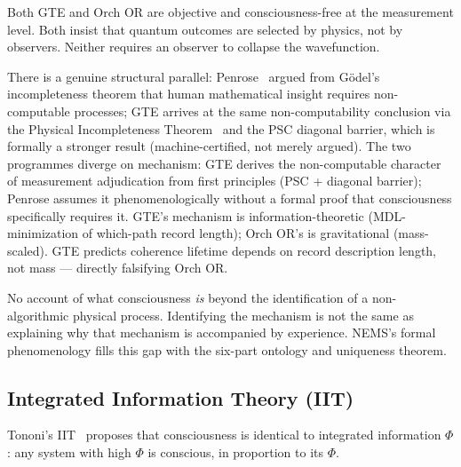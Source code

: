 \documentclass[11pt]{article}
\theoremstyle{remark}
\begin{document}
\medskip
\begin{termlist}
  \item[Genuine overlap]
    Both GTE and Orch OR are objective and consciousness-free at the measurement level.
    Both insist that quantum outcomes are selected by physics, not by observers. Neither
    requires an observer to collapse the wavefunction.

  \item[Key differences]
    There is a genuine structural parallel: Penrose~\cite{Penrose1989} argued
    from Gödel's incompleteness theorem that human mathematical insight requires
    non-computable processes; GTE arrives at the same non-computability conclusion
    via the Physical Incompleteness Theorem~\cite{SpivackNEMS11} and the PSC diagonal
    barrier, which is formally a stronger result (machine-certified, not merely argued).
    The two programmes diverge on mechanism: GTE derives the non-computable character
    of measurement adjudication from first
    principles (PSC + diagonal barrier); Penrose assumes it phenomenologically without
    a formal proof that consciousness specifically requires it.
    GTE's mechanism is information-theoretic (MDL-minimization of which-path record
    length); Orch OR's is gravitational (mass-scaled). GTE predicts coherence
    lifetime depends on record description length, not mass --- directly
    falsifying Orch OR.

  \item[What Orch OR lacks]
    No account of what consciousness \emph{is} beyond the identification of a
    non-algorithmic physical process. Identifying the mechanism is not the same as
    explaining why that mechanism is accompanied by experience. NEMS's formal
    phenomenology fills this gap with the six-part ontology and uniqueness theorem.
\end{termlist}

\subsection{Integrated Information Theory (IIT)}

Tononi's IIT~\cite{Tononi2004} proposes that consciousness is identical to integrated
information $\Phi$: any system with high $\Phi$ is conscious, in proportion to its $\Phi$.
\end{document}
